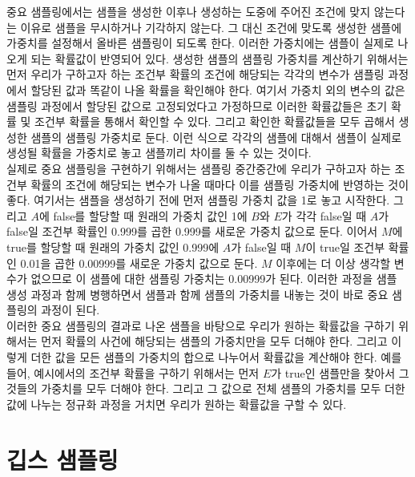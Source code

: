 \documentclass[a4paper]{oblivoir}
\begin{document}
중요 샘플링에서는 샘플을 생성한 이후나 생성하는 도중에 주어진 조건에 맞지 않는다는 이유로 샘플을 무시하거나 기각하지 않는다. 그 대신 조건에 맞도록 생성한 샘플에 가중치를 설정해서 올바른 샘플링이 되도록 한다. 이러한 가중치에는 샘플이 실제로 나오게 되는 확률값이 반영되어 있다. 생성한 샘플의 샘플링 가중치를 계산하기 위해서는 먼저 우리가 구하고자 하는 조건부 확률의 조건에 해당되는 각각의 변수가 샘플링 과정에서 할당된 값과 똑같이 나올 확률을 확인해야 한다. 여기서 가중치 외의 변수의 값은 샘플링 과정에서 할당된 값으로 고정되었다고 가정하므로 이러한 확률값들은 초기 확률 및 조건부 확률을 통해서 확인할 수 있다. 그리고 확인한 확률값들을 모두 곱해서 생성한 샘플의 샘플링 가중치로 둔다. 이런 식으로 각각의 샘플에 대해서 샘플이 실제로 생성될 확률을 가중치로 놓고 샘플끼리 차이를 둘 수 있는 것이다. \\

실제로 중요 샘플링을 구현하기 위해서는 샘플링 중간중간에 우리가 구하고자 하는 조건부 확률의 조건에 해당되는 변수가 나올 때마다 이를 샘플링 가중치에 반영하는 것이 좋다. 여기서는 샘플을 생성하기 전에 먼저 샘플링 가중치 값을 1로 놓고 시작한다. 그리고 $A$에 false를 할당할 때 원래의 가중치 값인 1에 $B$와 $E$가 각각 false일 때 $A$가 false일 조건부 확률인 0.999를 곱한 0.999를 새로운 가중치 값으로 둔다. 이어서 $M$에 true를 할당할 때 원래의 가중치 값인 0.999에 $A$가 false일 때 $M$이 true일 조건부 확률인 0.01을 곱한 0.00999를 새로운 가중치 값으로 둔다. $M$ 이후에는 더 이상 생각할 변수가 없으므로 이 샘플에 대한 샘플링 가중치는 0.00999가 된다. 이러한 과정을 샘플 생성 과정과 함께 병행하면서 샘플과 함께 샘플의 가중치를 내놓는 것이 바로 중요 샘플링의 과정이 된다. \\

이러한 중요 샘플링의 결과로 나온 샘플을 바탕으로 우리가 원하는 확률값을 구하기 위해서는 먼저 확률의 사건에 해당되는 샘플의 가중치만을 모두 더해야 한다. 그리고 이렇게 더한 값을 모든 샘플의 가중치의 합으로 나누어서 확률값을 계산해야 한다. 예를 들어, 예시에서의 조건부 확률을 구하기 위해서는 먼저 $E$가 true인 샘플만을 찾아서 그것들의 가중치를 모두 더해야 한다. 그리고 그 값으로 전체 샘플의 가중치를 모두 더한 값에 나누는 정규화 과정을 거치면 우리가 원하는 확률값을 구할 수 있다. 

\section{깁스 샘플링}

\end{document}
